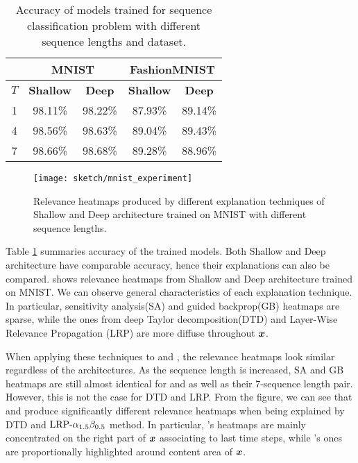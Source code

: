 \renewcommand{\arraystretch}{1.5}
\begin{table}[]
\centering
\begin{tabular}{cc|c|c|c|}
\cline{2-5}
& \multicolumn{2}{|c|}{\textbf{MNIST}} & \multicolumn{2}{|c|}{\textbf{FashionMNIST}} \\ \hline
\multicolumn{1}{|c|}{$T$}   & \multicolumn{1}{c|}{\textbf{Shallow}} & \multicolumn{1}{c|}{\textbf{Deep}} & \multicolumn{1}{c|}{\textbf{Shallow}} & \multicolumn{1}{c|}{\textbf{Deep}} \\ \hline
\multicolumn{1}{|c|}{1} & 98.11\%   & 98.22\% & 87.93\%  & 89.14\%                           \\
\multicolumn{1}{|c|}{4} & 98.56\% & 98.63\%  & 89.04\%  & 89.43\%                            \\
\multicolumn{1}{|c|}{7} & 98.66\%  & 98.68\% & 89.28\%  & 88.96\%  \\ \hline
\end{tabular}
\caption{Accuracy of models trained for sequence classification problem with different sequence lengths and dataset. }
\label{tab:mnist_model_acc}
\end{table}
\renewcommand{\arraystretch}{1}



 \begin{figure}[!htb]
\centering
\texttt{[image: sketch/mnist\_experiment]}
\caption{Relevance heatmaps produced by different explanation techniques of Shallow and Deep architecture trained on MNIST with different sequence lengths. \heatmapscaleexplain }
\label{fig:mnist_experiment}
\end{figure}


Table \ref{tab:mnist_model_acc} summaries accuracy of the trained models. Both Shallow and Deep architecture have comparable accuracy, hence their explanations can also be compared. \addfigure{\ref{fig:mnist_experiment}} shows relevance heatmaps from Shallow and Deep architecture trained on MNIST.  We can observe general characteristics of each explanation technique. In particular, sensitivity analysis(SA) and guided backprop(GB) heatmaps are sparse, while the ones from deep Taylor decomposition(DTD) and Layer-Wise Relevance Propagation (LRP) are more diffuse throughout $\boldsymbol{x}$. 

 When applying these techniques to   and , the relevance heatmaps look similar regardless of the architectures.  As the sequence length is increased, SA and GB heatmaps are still almost identical  for  and  as well as their 7-sequence length pair. However, this is not the case for DTD and LRP.  From the figure, we can see that  and   produce significantly different relevance heatmaps when  being explained by DTD and $\text{LRP-}\alpha_{1.5}\beta_{0.5}$ method.  In particular,   's heatmaps are mainly concentrated on the right part of $\boldsymbol{x}$ associating to last time steps, while  's ones are proportionally  highlighted around content area of $\boldsymbol{x}$.


